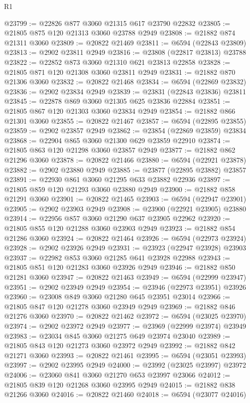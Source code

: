 \begin{lexlean}{R1}
\begin{coremodule}
@23799 := @22826 @877 @3060 @21315 @617 @23790 @22832
@23805 := @21805 @875 @120 @21313 @3060 @23788 @2949
@23808 := @21882 @874 @21311 @3060
@23809 := @20822 @21469
@23811 := @6594 (@22843 @23809)
@23813 := @2902 @23811 @2949
@23816 := @23808 (@22817 @23813) @23788
@23822 := @22852 @873 @3060 @21310 @621 @23813 @22858
@23828 := @21805 @871 @120 @21308 @3060 @23811 @2949
@23831 := @21882 @870 @21306 @3060
@23832 := @20822 @21468
@23834 := @6594 (@22869 @23832)
@23836 := @2902 @23834 @2949
@23839 := @23831 (@22843 @23836) @23811
@23845 := @22878 @869 @3060 @21305 @625 @23836 @22884
@23851 := @21805 @867 @120 @21303 @3060 @23834 @2949
@23854 := @21882 @866 @21301 @3060
@23855 := @20822 @21467
@23857 := @6594 (@22895 @23855)
@23859 := @2902 @23857 @2949
@23862 := @23854 (@22869 @23859) @23834
@23868 := @22904 @865 @3060 @21300 @629 @23859 @22910
@23874 := @21805 @863 @120 @21298 @3060 @23857 @2949
@23877 := @21882 @862 @21296 @3060
@23878 := @20822 @21466
@23880 := @6594 (@22921 @23878)
@23882 := @2902 @23880 @2949
@23885 := @23877 (@22895 @23882) @23857
@23891 := @22930 @861 @3060 @21295 @633 @23882 @22936
@23897 := @21805 @859 @120 @21293 @3060 @23880 @2949
@23900 := @21882 @858 @21291 @3060
@23901 := @20822 @21465
@23903 := @6594 (@22947 @23901)
@23905 := @2902 @23903 @2949
@23908 := @23900 (@22921 @23905) @23880
@23914 := @22956 @857 @3060 @21290 @637 @23905 @22962
@23920 := @21805 @855 @120 @21288 @3060 @23903 @2949
@23923 := @21882 @854 @21286 @3060
@23924 := @20822 @21464
@23926 := @6594 (@22973 @23924)
@23928 := @2902 @23926 @2949
@23931 := @23923 (@22947 @23928) @23903
@23937 := @22982 @853 @3060 @21285 @641 @23928 @22988
@23943 := @21805 @851 @120 @21283 @3060 @23926 @2949
@23946 := @21882 @850 @21281 @3060
@23947 := @20822 @21463
@23949 := @6594 (@22999 @23947)
@23951 := @2902 @23949 @2949
@23954 := @23946 (@22973 @23951) @23926
@23960 := @23008 @849 @3060 @21280 @645 @23951 @23014
@23966 := @21805 @847 @120 @21278 @3060 @23949 @2949
@23969 := @21882 @846 @21276 @3060
@23970 := @20822 @21462
@23972 := @6594 (@23025 @23970)
@23974 := @2902 @23972 @2949
@23977 := @23969 (@22999 @23974) @23949
@23983 := @23034 @845 @3060 @21275 @649 @23974 @23040
@23989 := @21805 @843 @120 @21273 @3060 @23972 @2949
@23992 := @21882 @842 @21271 @3060
@23993 := @20822 @21461
@23995 := @6594 (@23051 @23993)
@23997 := @2902 @23995 @2949
@24000 := @23992 (@23025 @23997) @23972
@24006 := @23060 @841 @3060 @21270 @653 @23997 @23066
@24012 := @21805 @839 @120 @21268 @3060 @23995 @2949
@24015 := @21882 @838 @21266 @3060
@24016 := @20822 @21460
@24018 := @6594 (@23077 @24016)

\end{coremodule}
\end{lexlean}
